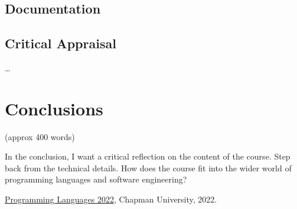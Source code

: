 \documentclass{article}
\theoremstyle{theorem}
\theoremstyle{definition}
\theoremstyle{remark}
\begin{document}
\subsection{Documentation}
\subsection{Critical Appraisal}

\ldots

\section{Conclusions}\label{conclusions}

(approx 400 words)

In the conclusion, I want a critical reflection on the content of the course. Step back from the technical details. How does the course fit into the wider world of programming languages and software engineering?

\begin{thebibliography}{99}
 \href{https://github.com/alexhkurz/programming-languages-2022/blob/main/README.md}{Programming Languages 2022}, Chapman University, 2022.
\end{thebibliography}
\end{document}

